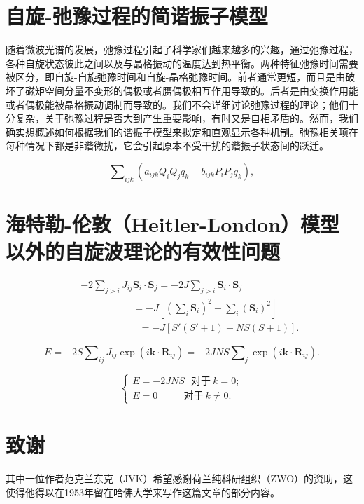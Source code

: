 \documentclass{article}
\begin{document}

\section{自旋-弛豫过程的简谐振子模型} \label{sec:10}

随着微波光谱的发展，弛豫过程引起了科学家们越来越多的兴趣，通过弛豫过程，各种自旋状态彼此之间以及与晶格振动的温度达到热平衡。两种特征弛豫时间需要被区分，即自旋-自旋弛豫时间和自旋-晶格弛豫时间。前者通常更短，而且是由破坏了磁矩空间分量不变形的偶极或者赝偶极相互作用导致的。后者是由交换作用能或者偶极能被晶格振动调制而导致的。我们不会详细讨论弛豫过程的理论；他们十分复杂，关于弛豫过程是否大到产生重要影响，有时又是自相矛盾的。然而，我们确实想概述如何根据我们的谐振子模型来拟定和直观显示各种机制。弛豫相关项在每种情况下都是非谐微扰，它会引起原本不受干扰的谐振子状态间的跃迁。



\begin{equation} \label{eq:127}
\sum\nolimits_{\mathit{ijk}}(a_\mathit{ijk}Q_iQ_jq_k+b_\mathit{ijk}P_iP_jq_k),
\end{equation}



\section{海特勒-伦敦（Heitler-London）模型以外的自旋波理论的有效性问题} \label{sec:11}


\begin{eqnarray} \label{eq:128}
&&-2\sum\nolimits_{j>i}J_{ij}\mathbf{S}_i\cdot\mathbf{S}_j=-2J\sum\nolimits_{j>i}\mathbf{S}_i\cdot\mathbf{S}_j\nonumber\\
&&~~~~~~~~~~~~~~~~~~~~~~~~=-J[(\sum\nolimits_i\mathbf{S}_i)^2-\sum\nolimits_i(\mathbf{S}_i)^2]\nonumber\\
&&~~~~~~~~~~~~~~~~~~~~~~~~~~~=-J[S'(S'+1)-NS(S+1)].
\end{eqnarray}

\begin{equation*} 
E=-2S\sum\nolimits_\mathit{ij}J_\mathit{ij}\exp(i\mathbf{k}\cdot\mathbf{R}_\mathit{ij})=-2JNS\sum\nolimits_j\exp(i\mathbf{k}\cdot\mathbf{R}_\mathit{ij}).
\end{equation*}

\begin{equation} \label{eq:129}
\left\{
\begin{array}{l}
E=-2JNS~~~\text{对于}~k=0;\\
E=0~~~~~~~~~~~~\text{对于}~k\neq 0.
\end{array}
\right.
\end{equation}

\section*{致谢}
其中一位作者范克兰东克（JVK）希望感谢荷兰纯科研组织（ZWO）的资助，这使得他得以在1953年留在哈佛大学来写作这篇文章的部分内容。
\end{document}

